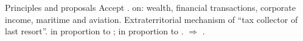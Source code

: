 \documentclass[aspectratio=169,xcolor=dvipsnames, 11pt,mathserif]{beamer}
\begin{document}
\begin{frame}{Principles and proposals}
    \bbsp \ip Accept .
    \ip {} on: wealth, financial transactions, corporate income, maritime and aviation.
    \ip Extraterritorial mechanism of ``tax collector of last resort''.
    \ip {} in proportion to ;  in proportion to .
    \ip $\Rightarrow$ . 
    \ee
\end{frame}
\end{document}

